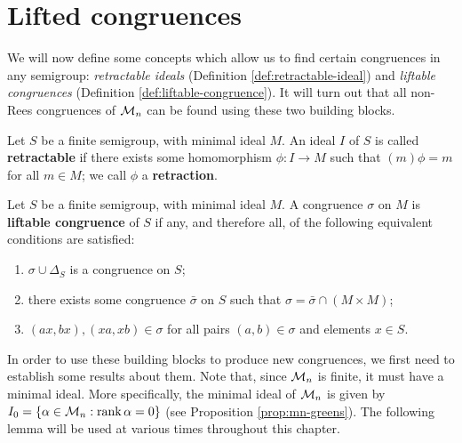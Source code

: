 \section{Lifted congruences}
\label{sec:motzkin-prelim}
We will now define some concepts which allow us to find certain
congruences in any semigroup: \textit{retractable ideals} (Definition
\ref{def:retractable-ideal}) and \textit{liftable congruences} (Definition
\ref{def:liftable-congruence}).  It will turn out that all non-Rees congruences
of $\mathcal{M}_n$ can be found using these two building blocks.

\begin{definition}
  \label{def:retractable-ideal}
   
  Let $S$ be a finite semigroup, with minimal ideal $M$.  An ideal $I$ of $S$ is
  called \textbf{retractable} if there exists some homomorphism $\phi: I \to M$
  such that $(m)\phi = m$ for all $m \in M$; we call $\phi$ a
  \textbf{retraction}.
\end{definition}

\begin{definition}
  \label{def:liftable-congruence}
  Let $S$ be a finite semigroup, with minimal ideal $M$.  A congruence $\sigma$
  on $M$ is \textbf{liftable congruence} of $S$ if any, and therefore all, of
  the following equivalent conditions are satisfied:
  \begin{enumerate}[\rm(i)]
  \item $\sigma \cup \Delta_S$ is a congruence on $S$;
  \item there exists some congruence $\bar\sigma$ on $S$ such that
    $\sigma= \bar\sigma \cap (M \times M)$;
  \item $(ax,bx),(xa,xb) \in \sigma$ for all pairs $(a,b) \in \sigma$ and
    elements $x \in S$.
  \end{enumerate}
\end{definition}

In order to use these building blocks to produce new congruences, we first need
to establish some results about them.  Note that, since $\mathcal{M}_n$ is finite, it
must have a minimal ideal.  More specifically, the minimal ideal of $\mathcal{M}_n$ is
given by $I_0 = \{\alpha \in \mathcal{M}_n : \operatorname{rank} \alpha = 0\}$ (see Proposition
\ref{prop:mn-greens}).  The following lemma will be used at various times
throughout this chapter.

